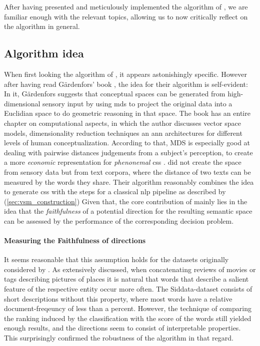 
After having presented and meticulously implemented the algorithm of \textcite{Derrac2015}, we are familiar enough with the relevant topics, allowing us to now critically reflect on the algorithm in general.

\subsection{Algorithm idea}

When first looking the algorithm of \textcite{Derrac2015}, it appears astonishingly specific. However after having read Gärdenfors' book \textcite{Gardenfors2000a}, the idea for their algorithm is self-evident: In it, Gärdenfors suggests that conceptual spaces can be generated from high-dimensional sensory input by using \gls{mds} to project the original data into a Euclidian space to do geometric reasoning in that space. The book has an entire chapter on computational aspects, in which the author discusses vector space models, dimensionality reduction techniques an \gls{ann} architectures for different levels of human conceptualization. According to that, MDS is especially good at dealing with pairwise distances judgements from a subject's perception, to create a more \textit{economic} representation for \textit{phenonemal} \glspl{cs} \cite[221]{Gardenfors2000a}. \textcite{Derrac2015} did not create the space from sensory data but from text corpora, where the distance of two texts can be measured by the words they share. Their algorithm reasonably combines the idea to generate \glspl{cs} with the steps for a classical \gls{nlp} pipeline as described by \cite{Turney2010} (\autoref{sec:vsm_construction}) Given that, the core contribution of \cite{Derrac2015} mainly lies in the idea that the \textit{faithfulness} of a potential direction for the resulting semantic space can be assessed by the performance of the corresponding decision problem.

\paragraph{Measuring the Faithfulness of directions}

It seems reasonable that this assumption holds for the datasets originally considered by \textcite{Derrac2015}. As extensively discussed, when concatenating reviews of movies or tags describing pictures of places it is natural that words that describe a salient feature of the respective entity occur more often. The Siddata-dataset consists of short descriptions without this property, where most words have a relative document-freqeuncy of less than a percent. However, the technique of comparing the ranking induced by the classification with the score of the words still yielded enough results, and the directions seem to consist of interpretable properties. This surprisingly confirmed the robustness of the algorithm in that regard.


